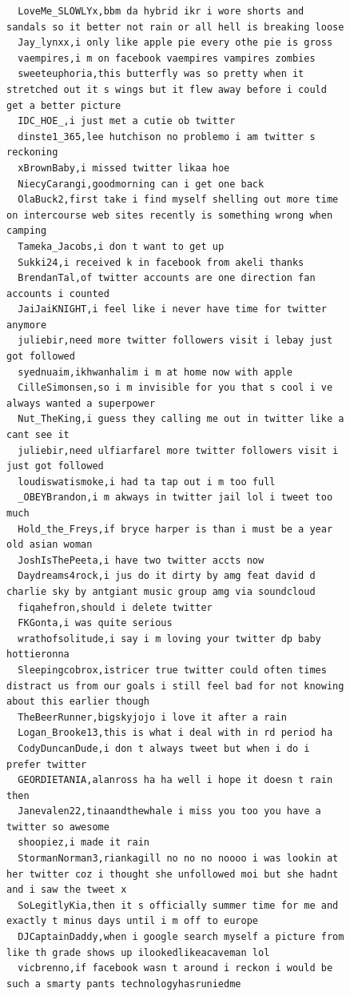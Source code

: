 \begin{figure}[htpb]
\begin{verbatim}
  LoveMe_SLOWLYx,bbm da hybrid ikr i wore shorts and sandals so it better not rain or all hell is breaking loose
  Jay_lynxx,i only like apple pie every othe pie is gross
  vaempires,i m on facebook vaempires vampires zombies
  sweeteuphoria,this butterfly was so pretty when it stretched out it s wings but it flew away before i could get a better picture
  IDC_HOE_,i just met a cutie ob twitter
  dinste1_365,lee hutchison no problemo i am twitter s reckoning
  xBrownBaby,i missed twitter likaa hoe
  NiecyCarangi,goodmorning can i get one back
  OlaBuck2,first take i find myself shelling out more time on intercourse web sites recently is something wrong when camping
  Tameka_Jacobs,i don t want to get up
  Sukki24,i received k in facebook from akeli thanks
  BrendanTal,of twitter accounts are one direction fan accounts i counted
  JaiJaiKNIGHT,i feel like i never have time for twitter anymore
  juliebir,need more twitter followers visit i lebay just got followed
  syednuaim,ikhwanhalim i m at home now with apple
  CilleSimonsen,so i m invisible for you that s cool i ve always wanted a superpower
  Nut_TheKing,i guess they calling me out in twitter like a cant see it
  juliebir,need ulfiarfarel more twitter followers visit i just got followed
  loudiswatismoke,i had ta tap out i m too full
  _OBEYBrandon,i m akways in twitter jail lol i tweet too much
  Hold_the_Freys,if bryce harper is than i must be a year old asian woman
  JoshIsThePeeta,i have two twitter accts now
  Daydreams4rock,i jus do it dirty by amg feat david d charlie sky by antgiant music group amg via soundcloud
  fiqahefron,should i delete twitter
  FKGonta,i was quite serious
  wrathofsolitude,i say i m loving your twitter dp baby hottieronna
  Sleepingcobrox,istricer true twitter could often times distract us from our goals i still feel bad for not knowing about this earlier though
  TheBeerRunner,bigskyjojo i love it after a rain
  Logan_Brooke13,this is what i deal with in rd period ha
  CodyDuncanDude,i don t always tweet but when i do i prefer twitter
  GEORDIETANIA,alanross ha ha well i hope it doesn t rain then
  Janevalen22,tinaandthewhale i miss you too you have a twitter so awesome
  shoopiez,i made it rain
  StormanNorman3,riankagill no no no noooo i was lookin at her twitter coz i thought she unfollowed moi but she hadnt and i saw the tweet x
  SoLegitlyKia,then it s officially summer time for me and exactly t minus days until i m off to europe
  DJCaptainDaddy,when i google search myself a picture from like th grade shows up ilookedlikeacaveman lol
  vicbrenno,if facebook wasn t around i reckon i would be such a smarty pants technologyhasruniedme

\end{verbatim}
\end{figure}
